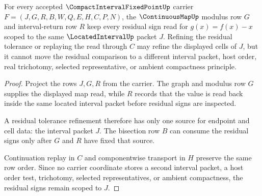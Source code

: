 \begin{theorem}
\label{thm:compact-interval-fixed-point-modulus-residual-stability}
For every accepted $\CompactIntervalFixedPointUp$ carrier $F=(J,G,R,B,W,Q,E,H,C,P,N)$, the $\ContinuousMapUp$ modulus row $G$ and interval-return row $R$ keep every residual sign read for $g(x)=f(x)-x$ scoped to the same $\LocatedIntervalUp$ packet $J$. Refining the residual tolerance or replaying the read through $C$ may refine the displayed cells of $J$, but it cannot move the residual comparison to a different interval packet, host order, real trichotomy, selected representative, or ambient compactness principle.
\end{theorem}
\begin{proof}
Project the rows $J,G,R$ from the carrier. The graph and modulus row $G$ supplies the displayed map read, while $R$ records that the value is read back inside the same located interval packet before residual signs are inspected.

A residual tolerance refinement therefore has only one source for endpoint and cell data: the interval packet $J$. The bisection row $B$ can consume the residual signs only after $G$ and $R$ have fixed that source.

Continuation replay in $C$ and componentwise transport in $H$ preserve the same row order. Since no carrier coordinate stores a second interval packet, a host order test, trichotomy, selected representatives, or ambient compactness, the residual signs remain scoped to $J$.
\end{proof}

